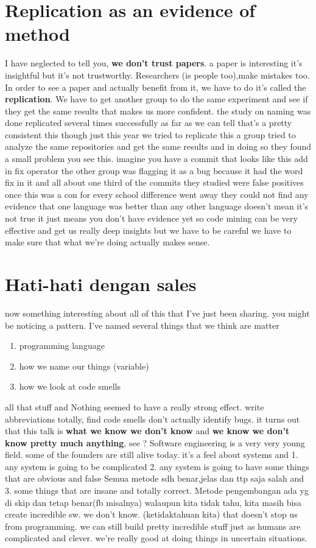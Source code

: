 \documentclass[conference, compsoc, twoside]{IEEEtran}
\begin{document}
\section{Replication as an evidence of method} %
I have neglected to tell you, \textbf{we don't trust papers}. 
a paper is interesting it's insightful but it's not trustworthy. 
Researchers (is people too),make mistakes too.
In order to see a paper and actually benefit from it, we have to do it's called the \textbf{replication}. 
We have to get another group to do the same experiment and see if they get the same results that makes us more confident. 
the study on naming was done replicated several times successfully as far as we can tell that's a pretty consistent this though just this year we tried to replicate this a group tried to analyze the same repositories and get the same results and in doing so they found a small problem you see this. 
imagine you have a commit that looks like this add in fix operator the other group was flagging it as a bug because it had the word fix in it and all about one third of the commits they studied were false positives once this was a con for every school difference went away they could not find any evidence that one language was better than any other language doesn't mean it's not true it just means you don't have evidence yet so code mining can be very effective and get us really deep insights but we have to be careful we have to make sure that what we're doing actually makes sense. 
\section{Hati-hati dengan sales}
now something interesting about all of this that I’ve just been sharing.
you  might be noticing a pattern. I’ve named several things that we think are matter
\begin{enumerate}
	\item programming language 
	\item how we name our things (variable)
	\item how we look at code smells
\end{enumerate}
all that stuff and Nothing seemed to have a really strong effect.
write abbreviations totally, find code smells don’t actually identify bugs.
it turns out that this talk is \textbf{what we know we don’t know} and 
\textbf{we know we don’t know pretty much anything}, see ? 
 Software  engineering is a very very young field.
  some of the founders
 are still alive today.
 it’s a feel about systems and
1.  any system
 is going to be complicated
2. any system is going to have some
 things that are obvious and false
 Semua metode sdh benar,jelas dan ttp saja salah
 and 
3. some things that are
 insane and totally correct. Metode pengembangan ada yg di skip dan tetap benar(fb misalnya) 
walaupun kita tidak tahu, kita masih bisa create incredible sw.
we don’t know. (ketidaktahuan kita)  that doesn’t stop us from programming. 
we can still build pretty incredible stuff just as humans are complicated and clever.
we’re really good at doing things in uncertain situations.
\end{document}

